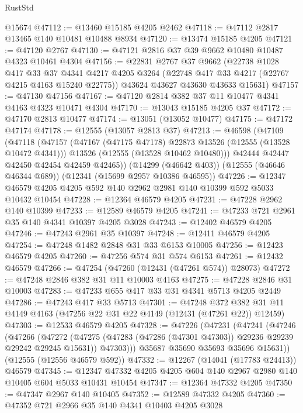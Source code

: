 \begin{lexlean}{RustStd}
\begin{coremodule}
    @15674
@47112 := @13460 @15185 @4205 @2462
@47118 := @47112 @2817 @13465 @140 @10481 @10488 @8934
@47120 := @13474 @15185 @4205
@47121 := @47120 @2767
@47130 := @47121 @2816 @37 @39 @9662 @10480 @10487 @4323 @10461 @4304
@47156 := @22831
    @2767
    @37
    @9662
    (@22738
      @1028
      @417
      @33
      @37
      @4341
      @4217
      @4205
      @3264
      (@22748 @417 @33 @4217 (@22767 @4215 @4163 @15240 @22775))
      @43624
      @43627
      @43630
      @43633
      @15631)
@47157 := @47130 @47156
@47167 := @47120 @2814 @382 @37 @11 @10477 @4341 @4163 @4323 @10471 @4304
@47170 := @13043 @15185 @4205 @37
@47172 := @47170 @2813 @10477
@47174 := @13051 (@13052 @10477)
@47175 := @47172 @47174
@47178 := @12555 (@13057 @2813 @37)
@47213 := @46598
    (@47109
      (@47118
        (@47157
          (@47167 (@47175 @47178) @22873 @13526 (@12555 (@13528 @10472 @4341)))
          @13526
          (@12555 (@13528 @10462 @10480)))
        @42444
        @42447
        @42450
        @42454
        @42459
        @42465))
    (@14299 (@46642 @403))
    (@12555 (@46646 @46344 @689))
    (@12341 (@15699 @2957 @10386 @46595))
@47226 := @12347 @46579 @4205 @4205 @592 @140 @2962 @2981 @140 @10399 @592 @5033 @10432 @10454
@47228 := @12364 @46579 @4205
@47231 := @47228 @2962 @140 @10399
@47233 := @12589 @46579 @4205
@47241 := @47233 @721 @2961 @35 @140 @4341 @10397 @4205 @3028
@47243 := @12402 @46579 @4205
@47246 := @47243 @2961 @35 @10397
@47248 := @12411 @46579 @4205
@47254 := @47248 @1482 @2848 @31 @33 @6153 @10005
@47256 := @12423 @46579 @4205
@47260 := @47256 @574 @31 @574 @6153
@47261 := @12432 @46579
@47266 := @47254 (@47260 (@12431 (@47261 @574)) @28073)
@47272 := @47248 @2846 @382 @31 @11 @10003 @4163
@47275 := @47228 @2846 @31 @10003
@47283 := @47233 @655 @417 @33 @31 @4341 @5713 @4205 @2449
@47286 := @47243 @417 @33 @5713
@47301 := @47248
    @372
    @382
    @31
    @11
    @4149
    @4163
    (@47256 @22 @31 @22 @4149 (@12431 (@47261 @22)) @12459)
@47303 := @12533 @46579 @4205
@47328 := @47226
    (@47231
      (@47241
        (@47246
          (@47266
            (@47272
              (@47275 (@47283 (@47286 (@47301 @47303)) @29236 @29239 @29242 @29245 @15631))
              @47303)))
        @35687
        @35690
        @35693
        @35696
        @15631))
    (@12555 (@12556 @46579 @592))
@47332 := @12267 (@14041 (@17783 @24413)) @46579
@47345 := @12347 @47332 @4205 @4205 @604 @140 @2967 @2980 @140 @10405 @604 @5033 @10431 @10454
@47347 := @12364 @47332 @4205
@47350 := @47347 @2967 @140 @10405
@47352 := @12589 @47332 @4205
@47360 := @47352 @721 @2966 @35 @140 @4341 @10403 @4205 @3028

\end{coremodule}
\end{lexlean}
